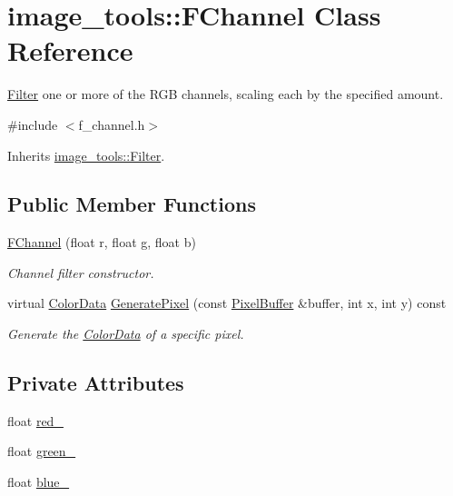 \hypertarget{classimage__tools_1_1FChannel}{}\section{image\+\_\+tools\+:\+:F\+Channel Class Reference}
\label{classimage__tools_1_1FChannel}


\hyperlink{classimage__tools_1_1Filter}{Filter} one or more of the R\+GB channels, scaling each by the specified amount.  




{\ttfamily \#include $<$f\+\_\+channel.\+h$>$}



Inherits \hyperlink{classimage__tools_1_1Filter}{image\+\_\+tools\+::\+Filter}.

\subsection*{Public Member Functions}
\begin{DoxyCompactItemize}
\item 
\hyperlink{classimage__tools_1_1FChannel_a25ea559c6411f4dcdcfad511987688b0}{F\+Channel} (float r, float g, float b)
\begin{DoxyCompactList}\small\item\em Channel filter constructor. \end{DoxyCompactList}\item 
virtual \hyperlink{classimage__tools_1_1ColorData}{Color\+Data} \hyperlink{classimage__tools_1_1FChannel_a749ce0d7e3b50b69a73c97917eeb7d0b}{Generate\+Pixel} (const \hyperlink{classimage__tools_1_1PixelBuffer}{Pixel\+Buffer} \&buffer, int x, int y) const 
\begin{DoxyCompactList}\small\item\em Generate the \hyperlink{classimage__tools_1_1ColorData}{Color\+Data} of a specific pixel. \end{DoxyCompactList}\end{DoxyCompactItemize}
\subsection*{Private Attributes}
\begin{DoxyCompactItemize}
\item 
float \hyperlink{classimage__tools_1_1FChannel_a6d2b5a5e5bffb3673df6191cf642f337}{red\+\_\+}
\item 
float \hyperlink{classimage__tools_1_1FChannel_a42ef11eef9bfad14df5007959047ccc6}{green\+\_\+}
\item 
float \hyperlink{classimage__tools_1_1FChannel_a3eb08bcf47005e1672b4516b0c75d7a9}{blue\+\_\+}
\end{DoxyCompactItemize}


